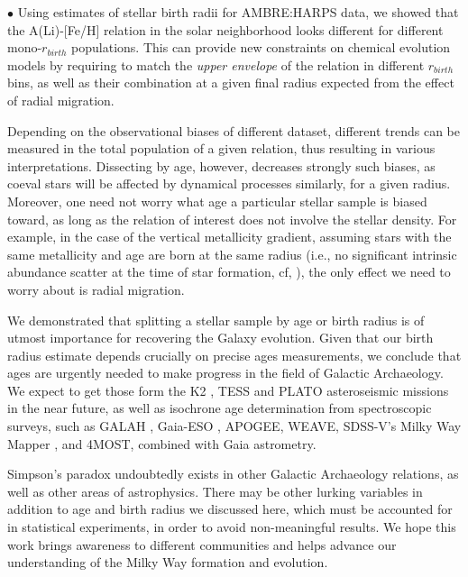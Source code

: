 \documentclass[usenatbib]{mnras}
\begin{document}
$\bullet$ Using estimates of stellar birth radii for AMBRE:HARPS data, we showed that the A(Li)-[Fe/H] relation in the solar neighborhood looks different for different mono-$r_{birth}$ populations. This can provide new constraints on chemical evolution models by requiring to match the {\it upper envelope} of the relation in different $r_{birth}$ bins, as well as their combination at a given final radius expected from the effect of radial migration.

Depending on the observational biases of different dataset, different trends can be measured in the total population of a given relation, thus resulting in various interpretations. Dissecting by age, however, decreases strongly such biases, as coeval stars will be affected by dynamical processes similarly, for a given radius. Moreover, one need not worry what age a particular stellar sample is biased toward, as long as the relation of interest does not involve the stellar density. For example, in the case of the vertical metallicity gradient, assuming stars with the same metallicity and age are born at the same radius (i.e., no significant intrinsic abundance scatter at the time of star formation, cf, \citealt{spitoni19}), the only effect we need to worry about is radial migration. 

We demonstrated that splitting a stellar sample by age or birth radius is of utmost importance for recovering the Galaxy evolution. Given that our birth radius estimate depends crucially on precise ages measurements, we conclude that ages are urgently needed to make progress in the field of Galactic Archaeology. We expect to get those form the K2 \citep{howell14}, TESS \citep{ricker15} and PLATO \citep{rauer14} asteroseismic missions in the near future, as well as isochrone age determination from spectroscopic surveys, such as GALAH \citep{desilva15}, Gaia-ESO \citep{gilmore12}, APOGEE, WEAVE, SDSS-V's Milky Way Mapper \citep{kollmeier17}, and 4MOST, combined with Gaia astrometry. 

Simpson's paradox undoubtedly exists in other Galactic Archaeology relations, as well as other areas of astrophysics. There may be other lurking variables in addition to age and birth radius we discussed here, which must be accounted for in statistical experiments, in order to avoid non-meaningful results. We hope this work brings awareness to different communities and helps advance our understanding of the Milky Way formation and evolution.







\end{document}
